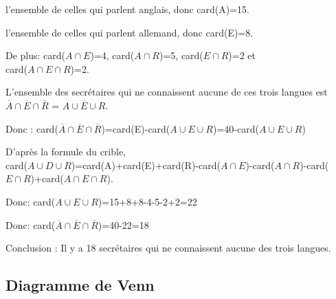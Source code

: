 \documentclass[12pt]{article}
\begin{document}
l'ensemble  de celles qui parlent anglais, donc  card(A)=15.

l'ensemble  de celles qui parlent allemand, donc card(E)=8. 

De plus: card($A\cap E$)=4, card($A\cap R$)=5, card($E\cap R$)=2 et\\ card($A\cap E\cap R$)=2.

L'ensemble des secrétaires qui ne connaissent aucune de ces trois langues est $\overline{A}\cap \overline{E}\cap \overline{R}$ = $\overline{A\cup E\cup R}$.

Donc : card($\overline{A}\cap \overline{E}\cap \overline{R}$)=card(E)-card($A\cup E\cup R$)=40-card($A\cup E\cup R$)

D'après la formule du crible,\\
card($A\cup D\cup R$)=card(A)+card(E)+card(R)-card($A\cap E$)-card($A\cap R$)-card($E\cap R$)+card($A\cap E\cap R$).

Donc: card($A\cup E\cup R$)=15+8+8-4-5-2+2=22

Donc: card($\overline{A}\cap \overline{E}\cap \overline{R}$)=40-22=18

Conclusion : Il y a 18 secrétaires qui ne connaissent aucune des trois langues.

\subsection*{Diagramme de Venn}

\end{document}
